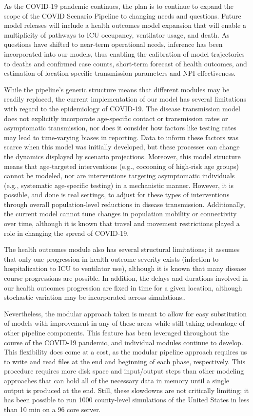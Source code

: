 {As the COVID-19 pandemic continues, the plan is to continue to expand the scope of the COVID Scenario Pipeline to changing needs and questions. Future model releases will include a health outcomes model expansion that will enable a multiplicity of pathways to ICU occupancy, ventilator usage, and death. As questions have shifted to near-term operational needs, inference has been incorporated into our models, thus enabling the calibration of model trajectories to deaths and confirmed case counts, short-term forecast of health outcomes, and estimation of location-specific transmission parameters and NPI effectiveness.

While the pipeline’s generic structure means that different modules may be readily replaced, the current implementation of our model has several limitations with regard to the epidemiology of COVID-19. The disease transmission model does not explicitly incorporate age-specific contact or transmission rates or asymptomatic transmission, nor does it consider how factors like testing rates may lead to time-varying biases in reporting. Data to inform these factors was scarce when this model was initially developed, but these processes can change the dynamics displayed by scenario projections. Moreover, this model structure means that age-targeted interventions  (e.g., cocooning of high-risk age groups) cannot be modeled, nor are interventions targeting asymptomatic individuals (e.g., systematic age-specific testing) in a mechanistic manner. However, it is possible, and done is real settings, to adjust for these types of interventions through overall population-level reductions in disease transmission. Additionally, the current model cannot tune changes in population mobility or connectivity over time, although it is known that travel and movement restrictions played a role in changing the spread of COVID-19.

The health outcomes module also has several structural limitations; it assumes that only one progression in health outcome severity exists (infection to hospitalization to ICU to ventilator use), although it is known that many disease course progressions are possible. In addition, the delays and durations involved in our health outcomes progression are fixed in time for a given location, although stochastic variation may be incorporated across simulations..

Nevertheless, the modular approach taken is meant to allow for easy substitution of models with improvement in any of these areas while still taking advantage of other pipeline components. This feature has been leveraged throughout the course of the COVID-19 pandemic, and individual modules continue to develop. This flexibility does come at a cost, as the modular pipeline approach requires us to write and read files at the end and beginning of each phase, respectively. This procedure requires more disk space and input/output steps than other modeling approaches that can hold all of the necessary data in memory until a single output is produced at the end. Still, these slowdowns are not critically limiting; it has been possible to run 1000 county-level simulations of the United States in less than 10 min on a 96 core server.


}
